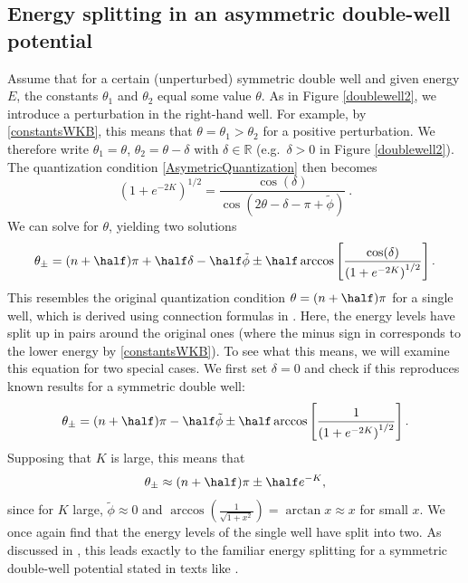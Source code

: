 \documentclass[12pt]{article}
\begin{document}
\subsection{Energy splitting in an asymmetric double-well potential}
\label{EnSplitWKBAsymm}
Assume that for a certain (unperturbed) symmetric double well and given energy $E$, the constants $\theta_1$ and $\theta_2$ equal some value $\theta$.
As in Figure \ref{doublewell2}, we introduce a perturbation in the right-hand well.
For example, by \eqref{constantsWKB}, this means that $\theta=\theta_1>\theta_2$ for a positive perturbation.
We therefore write $\theta_1=\theta$, $\theta_2=\theta-\delta$ with $\delta\in\mathbb{R}$ (e.g.\ $\delta>0$ in Figure \ref{doublewell2}).
The quantization condition \eqref{AsymetricQuantization} then becomes 
\begin{equation}
\left(1+e^{-2K}\right)^{1/2}=\frac{\cos(\delta)}{\cos(2\theta-\delta-\pi+\tilde{\phi})}\ .
\end{equation}
 We can solve for $\theta$, yielding two solutions
\begin{equation}
\theta_{\pm}=(n+\half)\pi +\half\delta -\half\tilde{\phi} \pm \half\arccos\left[\frac{\cos(\delta)}{\left(1+e^{-2K}\right)^{1/2}}\right].
\label{SolutionTheta}
\end{equation}
This resembles the original quantization condition $\theta=(n+\half)\pi$ for a single well, which is derived using connection formulas in \cite{Griffiths}. 
Here, the energy levels have split up in pairs around the original ones (where the minus sign in  corresponds to the lower energy by \eqref{constantsWKB}).
To see what this means, we will examine this equation for two special cases.
We first set $\delta=0$ and check if this reproduces known results for a symmetric double well:
\begin{equation}
\theta_{\pm}=(n+\half)\pi -\half\tilde{\phi} \pm \half\arccos\left[\frac{1}{\left(1+e^{-2K}\right)^{1/2}}\right].
\end{equation}
Supposing that $K$ is large, this means that
\begin{equation}
\theta_{\pm}\approx(n+\half)\pi \pm \half e^{-K},
\end{equation}
since for $K$ large, $\tilde{\phi}\approx 0$ and $\arccos\left(\frac{1}{\sqrt{1+x^2}}\right)=\arctan{x}\approx x$ for small $x$.
We once again find that the energy levels of the single well have split into two.
As discussed in \cite{Froman}, this leads exactly to the familiar energy splitting for a symmetric double-well potential stated in texts like \cite{LL}.
\end{document}
